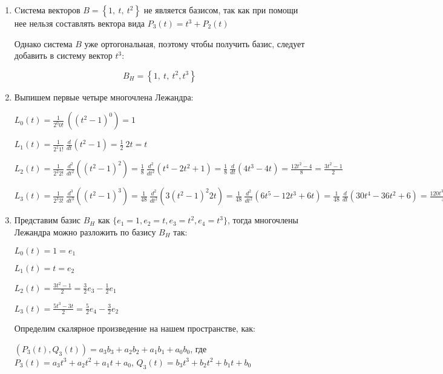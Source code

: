 \begin{enumerate}
    \item Cистема векторов $B=\left\{1,\ t,\ t^2\right\}$ не является базисом, так как при помощи нее нельзя составлять вектора вида $P_3(t) = t^3 + P_2(t)$

    Однако система $B$ уже ортогональная, поэтому чтобы получить базис, следует добавить в систему вектор $t^3$:

    \[B_H = \left\{1,\ t,\ t^2, t^3\right\}\]

    \item Выпишем первые четыре многочлена Лежандра:

    $\displaystyle L_0\left(t\right)=\frac{1}{2^0 0!}\ \left(\left(t^2-1\right)^0\right) = 1$

    $\displaystyle L_1\left(t\right)=\frac{1}{2^1 1!}\ \frac{d}{dt}\left(t^2-1\right) = \frac{1}{2}\ 2t = t$

    $\displaystyle L_2\left(t\right)=\frac{1}{2^2 2!}\ \frac{d^2}{dt^2}\left(\left(t^2-1\right)^2\right) =
    \frac{1}{8}\ \frac{d^2}{dt^2}\left(t^4 - 2t^2 + 1\right) = \frac{1}{8}\ \frac{d}{dt}\left(4t^3 - 4t\right) = \frac{12t^2 - 4}{8} = \frac{3t^2 - 1}{2}$

    $\displaystyle L_3\left(t\right)=\frac{1}{2^3 3!}\ \frac{d^3}{dt^3}\left(\left(t^2-1\right)^3\right) =
    \frac{1}{48}\ \frac{d^2}{dt^2}\left(3 \left(t^2-1\right)^2 2t\right) = \frac{1}{48}\ \frac{d^2}{dt^2}\left(6t^5 - 12t^3 + 6t\right) =
    \frac{1}{48}\ \frac{d}{dt}\left(30t^4 - 36t^2 + 6\right) = \frac{120t^3 - 72t}{48} = \frac{5t^3 - 3t}{2}$

    \item Представим базис $B_H$ как $\{e_1 = 1, e_2 = t, e_3 = t^2, e_4 = t^3\}$, тогда многочлены Лежандра можно разложить по базису $B_H$ так:

    $\displaystyle L_0\left(t\right) = 1 = e_1$

    $\displaystyle L_1\left(t\right) = t = e_2$

    $\displaystyle L_2\left(t\right) = \frac{3t^2 - 1}{2} = \frac{3}{2} e_3 - \frac{1}{2} e_1$

    $\displaystyle L_3\left(t\right) = \frac{5t^3 - 3t}{2} = \frac{5}{2} e_4 - \frac{3}{2} e_2$

    Определим скалярное произведение на нашем пространстве, как:

    $(P_3(t), Q_3(t)) = a_3 b_3 + a_2 b_2 + a_1 b_1 + a_0 b_0$, где $P_3(t) = a_3 t^3 + a_2 t^2 + a_1 t + a_0$, $Q_3(t) = b_3 t^3 + b_2 t^2 + b_1 t + b_0$


\end{enumerate}
